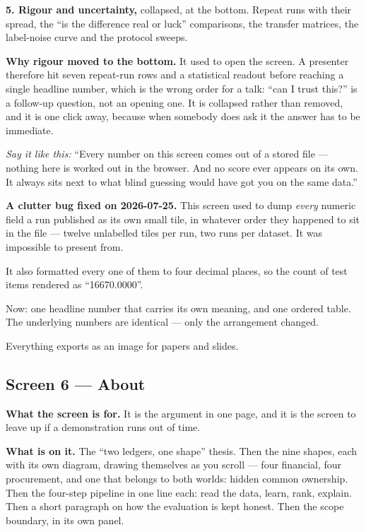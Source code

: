 \documentclass[11pt,a4paper]{article}
\newcommand{\aloud}[1]{\par\smallskip\noindent\textit{\textcolor{accent}{Say
it like this:}} ``#1''\par\smallskip}
\begin{document}
\textbf{5. Rigour and uncertainty,} collapsed, at the bottom. Repeat runs with
their spread, the ``is the difference real or luck'' comparisons, the transfer
matrices, the label-noise curve and the protocol sweeps.

\begin{plain}
\textbf{Why rigour moved to the bottom.} It used to open the screen. A presenter
therefore hit seven repeat-run rows and a statistical readout before reaching a
single headline number, which is the wrong order for a talk: ``can I trust
this?'' is a follow-up question, not an opening one. It is collapsed rather than
removed, and it is one click away, because when somebody does ask it the answer
has to be immediate.
\end{plain}

\aloud{Every number on this screen comes out of a stored file --- nothing here is
worked out in the browser. And no score ever appears on its own. It always sits
next to what blind guessing would have got you on the same data.}

\begin{warnbox}
\textbf{A clutter bug fixed on 2026-07-25.} This screen used to dump
\emph{every} numeric field a run published as its own small tile, in whatever
order they happened to sit in the file --- twelve unlabelled tiles per run, two
runs per dataset. It was impossible to present from.

It also formatted every one of them to four decimal places, so the count of
test items rendered as ``16670.0000''.

Now: one headline number that carries its own meaning, and one ordered table.
The underlying numbers are identical --- only the arrangement changed.
\end{warnbox}

Everything exports as an image for papers and slides.

\subsection{Screen 6 --- About}

\textbf{What the screen is for.} It is the argument in one page, and it is the
screen to leave up if a demonstration runs out of time.

\textbf{What is on it.} The ``two ledgers, one shape'' thesis. Then the nine
shapes, each with its own diagram, drawing themselves as you scroll --- four
financial, four procurement, and one that belongs to both worlds: hidden common
ownership. Then the four-step pipeline in one line each: read the data, learn,
rank, explain. Then a short paragraph on how the evaluation is kept honest.
Then the scope boundary, in its own panel.
\end{document}

